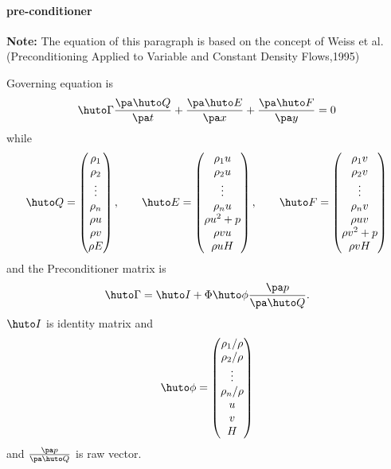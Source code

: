 \documentclass{jsarticle}
\newcommand{\bQ}{\huto Q}
\newcommand{\bI}{\huto I}
\newcommand{\bE}{\huto E}
\newcommand{\bF}{\huto F}
\newcommand{\bG}{\huto \Gamma}
\newcommand{\bp}{\huto \phi}
\begin{document}
\paragraph{pre-conditioner}

\hspace{1em}

\textbf{Note:} The equation of this paragraph is based on the concept of Weiss et al.(Preconditioning Applied to Variable and Constant Density Flows,1995)

\hspace{1em}

Governing equation is 
\begin{equation}
\bG \frac{\pa \bQ}{\pa t} + \frac{\pa \bE}{\pa x} + \frac{\pa \bF}{\pa y} = 0
\end{equation}
while
\begin{equation}
\bQ=\begin{pmatrix}
\rho _1 \\
\rho _2 \\
\vdots\\
\rho _n \\
\rho u\\
\rho v\\
\rho E
\end{pmatrix},
\hspace{2em}
\bE=\begin{pmatrix}
\rho _1 u\\
\rho _2 u\\
\vdots\\
\rho _n u\\
\rho u^2 + p\\
\rho vu\\
\rho u H
\end{pmatrix},
\hspace{2em}
\bF=\begin{pmatrix}
\rho _1 v\\
\rho _2 v\\
\vdots\\
\rho _n v\\
\rho uv\\
\rho v^2 + p\\
\rho v H
\end{pmatrix}
\end{equation}
and the Preconditioner matrix is 
\begin{equation}
\bG = \bI + \Phi \bp \frac{\pa p}{\pa \bQ}.
\end{equation}
$\bI$ is identity matrix and 
\begin{equation}
\bp = \begin{pmatrix}
\rho _1 /\rho\\
\rho _2 /\rho\\
\vdots\\
\rho _n /\rho\\
u\\
v\\
H
\end{pmatrix}
\end{equation}
and $\frac{\pa p}{\pa \bQ}$ is raw vector.
\end{document}
